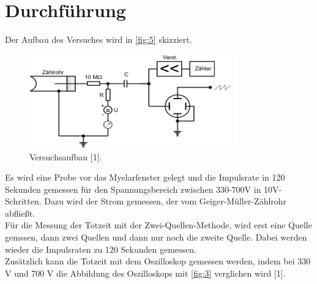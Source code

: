 \section{Durchführung}
Der Aufbau des Versuches wird in \autoref{fig:5} skizziert.
\begin{figure}[H] 
  \centering 
  \includegraphics[width=9cm]{content/5.png} 
  \caption{Versuchsaufbau [1].} 
  \label{fig:5} 
\end{figure}
Es wird eine Probe vor das Myelarfenster gelegt und die Impulsrate in 120 Sekunden gemessen für den Spannungsbereich zwischen 330-700V in 10V-Schritten. Dazu wird der Strom gemessen, der vom Geiger-Müller-Zählrohr abfließt.\\
Für die Messung der Totzeit mit der Zwei-Quellen-Methode, wird erst eine Quelle gemssen, dann zwei Quellen und dann nur noch die zweite Quelle. Dabei werden wieder die Impulsraten zu 120 Sekunden gemessen.\\
Zusätzlich kann die Totzeit mit dem Oszilloskop gemessen werden, indem bei 330 V und 700 V die Abbildung des Oszilloskops mit \autoref{fig:3} verglichen wird [1]. 
